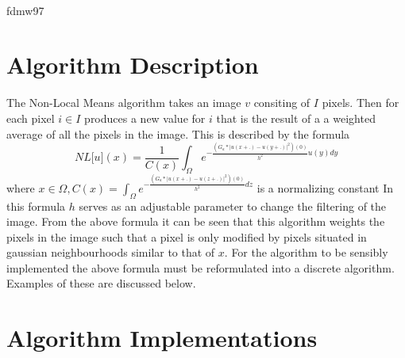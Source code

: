 \documentclass[11pt,letterpaper]{article}
\begin{document}
\vspace*{0.2in}

\begin{flushleft}
{\Large
\textbf{}
}
\newline

\\
fdmw97
\\
\bigskip

\end{flushleft}

\section*{Algorithm Description}
The Non-Local Means algorithm takes an image $v$ consiting of $I$ pixels. Then for each pixel $i \in I$ produces a new value for $i$ that is the result of a a weighted average of all the pixels in the image. This is described by the formula
$$\mathit{NL}[\mathit{u](x)} = \frac{1}{\mathit{C(x)}}\int_{\Omega}^{}\mathit{e^{-\frac{(G_{a}*|u(x+.)-u(y+.)|^{2})(0)}{h^{2}}u(y) dy}}$$
where $\mathit{x \in \Omega, C(x) = \int_{\Omega}^{}e^{-\frac{(G_{a}*|u(x+.)-u(z+.)|^{2})(0)}{h^{2}}dz}}$ is a normalizing constant\cite{paper1}
In this formula $h$ serves as an adjustable parameter to change the filtering of the image. From the above formula it can be seen that this algorithm weights the pixels in the image such that a pixel is only modified by pixels situated in gaussian neighbourhoods similar to that of $x$.
For the algorithm to be sensibly implemented the above formula must be reformulated into a discrete algorithm. Examples of these are discussed below.

\section*{Algorithm Implementations}
\end{document}
